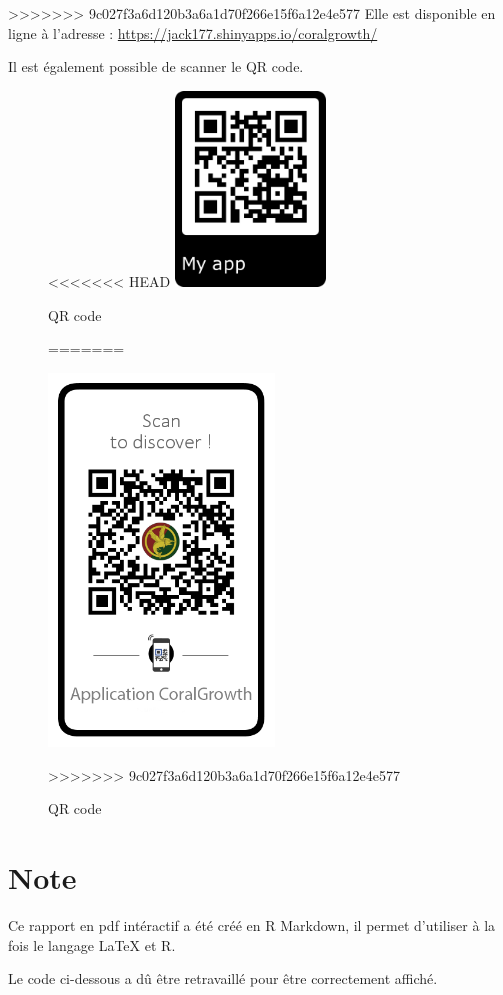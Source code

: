 \documentclass[]{report}
\begin{document}
>>>>>>> 9c027f3a6d120b3a6a1d70f266e15f6a12e4e577
Elle est disponible en ligne à l'adresse :
\url{https://jack177.shinyapps.io/coralgrowth/}

Il est également possible de scanner le QR code.

\begin{figure}[h!]
<<<<<<< HEAD
\includegraphics[width=4cm]{../image/App_Coral_Growth.png}
\caption{QR code}
=======
\begin{centering}
\includegraphics[width=6cm]{../image/QRcode.png}
\caption{QR code}
\end{centering}
>>>>>>> 9c027f3a6d120b3a6a1d70f266e15f6a12e4e577
\end{figure}

\chapter{Note}\label{note}

Ce rapport en pdf intéractif a été créé en R Markdown, il permet
d'utiliser à la fois le langage LaTeX et R.

Le code ci-dessous a dû être retravaillé pour être correctement affiché.
\end{document}
